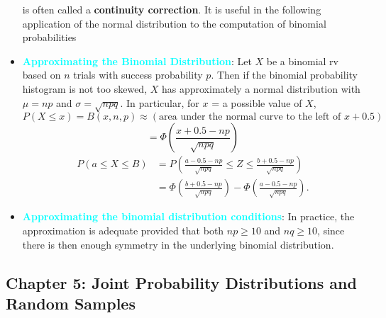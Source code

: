 \documentclass{report}
\begin{document}
\begin{itemize}
        is often called a \textbf{continuity correction}. It is useful in the following application of the normal distribution to the computation of binomial probabilities
    \item \textbf{\textcolor{cyan}{Approximating the Binomial Distribution}}:
        Let \( X \) be a binomial rv based on \( n \) trials with success probability \( p \). Then if the binomial probability histogram is not too skewed, \( X \) has approximately a normal distribution with \( \mu = np \) and \( \sigma = \sqrt{npq} \). In particular, for \( x \) = a possible value of \( X \),
        \[
            P(X \leq x) = B(x, n, p) \approx \left( \text{area under the normal curve to the left of } x + 0.5 \right)
        \]
        \[
            = \Phi \left( \frac{x + 0.5 - np}{\sqrt{npq}} \right)
        \]
        \begin{align*}
            P(a \leq X \leq B) &= P\left(\frac{a - 0.5 - np}{\sqrt{npq}} \leq Z \leq \frac{b + 0.5 - np}{\sqrt{npq}}\right) \\
            &=\Phi\left(\frac{b+0.5-np}{\sqrt{npq}}\right) - \Phi\left(\frac{a-0.5-np}{\sqrt{npq}}\right)
        .\end{align*}
    \item \textbf{\textcolor{cyan}{Approximating the binomial distribution conditions}}:
        In practice, the approximation is adequate provided that both \( np \geq 10 \) and \( nq \geq 10 \), since there is then enough symmetry in the underlying binomial distribution.
    \end{itemize}

    \pagebreak 
    \subsection{Chapter 5: Joint Probability Distributions and Random Samples}
    \bigbreak \noindent 
\end{document}
